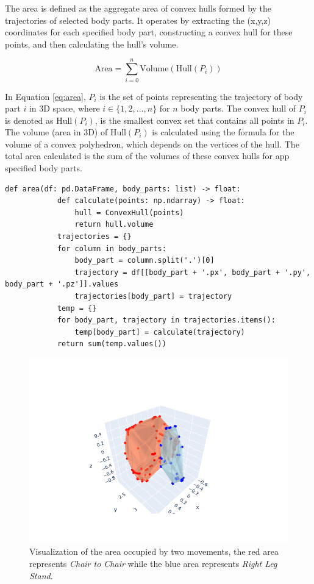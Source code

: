                 The area is defined as the aggregate area of convex hulls formed by the trajectories of selected body parts. It operates by extracting the (x,y,z) coordinates for each specified body part, constructing a convex hull for these points, and then calculating the hull's volume.

                \begin{equation}\label{eq:area}
                    \text{Area} = \sum_{i=0}^{n} \text{Volume}(\text{Hull}(P_i))
                \end{equation}
            
                In Equation \ref{eq:area}, $P_i$ is the set of points representing the trajectory of body part $i$ in 3D space, where $i \in \{1, 2, ..., n\}$ for $n$ body parts. The convex hull of $P_i$ is denoted as $\text{Hull}(P_i)$, is the smallest convex set that contains all points in $P_i$. The volume (area in 3D) of $\text{Hull}(P_i)$ is calculated using the formula for the volume of a convex polyhedron, which depends on the vertices of the hull. The total area calculated is the sum of the volumes of these convex hulls for app specified body parts.
                
        \begin{lstlisting}[caption={Area calculation method using the ConvexHull class from the SciPy library.}] 
        def area(df: pd.DataFrame, body_parts: list) -> float:
            def calculate(points: np.ndarray) -> float:
                hull = ConvexHull(points)
                return hull.volume
            trajectories = {}
            for column in body_parts:
                body_part = column.split('.')[0]
                trajectory = df[[body_part + '.px', body_part + '.py', body_part + '.pz']].values
                trajectories[body_part] = trajectory
            temp = {}
            for body_part, trajectory in trajectories.items():
                temp[body_part] = calculate(trajectory)
            return sum(temp.values())
        \end{lstlisting}

                \begin{figure}[H]
                    \centering
                    \includegraphics[width=.6\textwidth]{../src/resources/area.png}
                    \caption{
                        Visualization of the area occupied by two movements, the red area represents \textit{Chair to Chair} while the blue area represents \textit{Right Leg Stand}. 
                    }
                    \label{fig:area}
                \end{figure}
            
